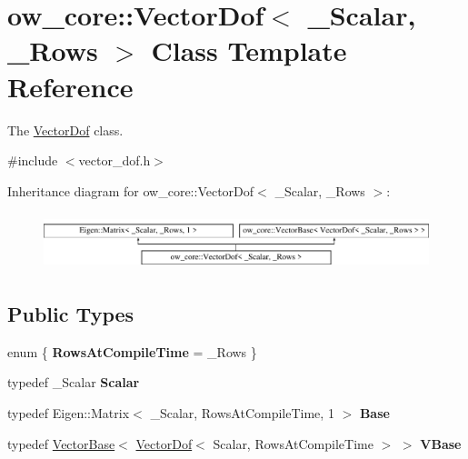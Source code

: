 \hypertarget{classow__core_1_1VectorDof}{}\section{ow\+\_\+core\+:\+:Vector\+Dof$<$ \+\_\+\+Scalar, \+\_\+\+Rows $>$ Class Template Reference}
\label{classow__core_1_1VectorDof}


The \hyperlink{classow__core_1_1VectorDof}{Vector\+Dof} class.  




{\ttfamily \#include $<$vector\+\_\+dof.\+h$>$}

Inheritance diagram for ow\+\_\+core\+:\+:Vector\+Dof$<$ \+\_\+\+Scalar, \+\_\+\+Rows $>$\+:\begin{figure}[H]
\begin{center}
\leavevmode
\includegraphics[height=1.661721cm]{d9/d10/classow__core_1_1VectorDof}
\end{center}
\end{figure}
\subsection*{Public Types}
\begin{DoxyCompactItemize}
\item 
enum \{ {\bfseries Rows\+At\+Compile\+Time} = \+\_\+\+Rows
 \}\hypertarget{classow__core_1_1VectorDof_af7a9e9c9d14a862d1a52d5a627e7c917}{}\label{classow__core_1_1VectorDof_af7a9e9c9d14a862d1a52d5a627e7c917}

\item 
typedef \+\_\+\+Scalar {\bfseries Scalar}\hypertarget{classow__core_1_1VectorDof_acf92659e64b4ee228fbf3ae573680655}{}\label{classow__core_1_1VectorDof_acf92659e64b4ee228fbf3ae573680655}

\item 
typedef Eigen\+::\+Matrix$<$ \+\_\+\+Scalar, Rows\+At\+Compile\+Time, 1 $>$ {\bfseries Base}\hypertarget{classow__core_1_1VectorDof_a92d1b8582f3e6cc859762e9e8938dc43}{}\label{classow__core_1_1VectorDof_a92d1b8582f3e6cc859762e9e8938dc43}

\item 
typedef \hyperlink{classow__core_1_1VectorBase}{Vector\+Base}$<$ \hyperlink{classow__core_1_1VectorDof}{Vector\+Dof}$<$ Scalar, Rows\+At\+Compile\+Time $>$ $>$ {\bfseries V\+Base}\hypertarget{classow__core_1_1VectorDof_ada558a5587f014075c2b1eff9ac5c41e}{}\label{classow__core_1_1VectorDof_ada558a5587f014075c2b1eff9ac5c41e}

\end{DoxyCompactItemize}
